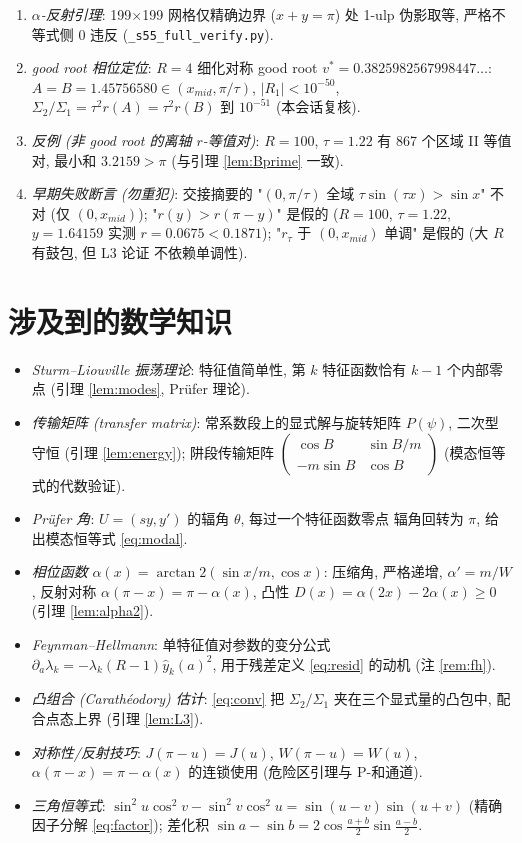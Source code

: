 \documentclass[UTF8]{ctexart}
\begin{document}
\begin{enumerate}
		(\texttt{\_s55\_bprime\_grid.py}, \texttt{\_s55\_minpair\_precise.py},
		本会话复核).
	\item \emph{$\alpha$-反射引理}: 199$\times$199 网格仅精确边界
		($x+y=\pi$) 处 1-ulp 伪影取等, 严格不等式侧 0 违反
		(\texttt{\_s55\_full\_verify.py}).
	\item \emph{good root 相位定位}: $R=4$ 细化对称 good root
		$v^*=0.3825982567998447\ldots$: $A=B=1.45756580\in(x_{mid},\pi/\tau)$,
		$|R_1|<10^{-50}$, $\Sigma_2/\Sigma_1=\tau^2r(A)=\tau^2r(B)$ 到 $10^{-51}$
		(本会话复核).
	\item \emph{反例 (非 good root 的离轴 $r$-等值对)}: $R=100$, $\tau=1.22$ 有
		867 个区域 II 等值对, 最小和 $3.2159>\pi$ (与引理 \ref{lem:Bprime} 一致).
	\item \emph{早期失败断言 (勿重犯)}: 交接摘要的 "$(0,\pi/\tau)$ 全域
		$\tau\sin(\tau x)>\sin x$" 不对 (仅 $(0,x_{mid})$); "$r(y)>r(\pi-y)$"
		是假的 ($R=100$, $\tau=1.22$, $y=1.64159$ 实测 $r=0.0675<0.1871$);
		"$r_\tau$ 于 $(0,x_{mid})$ 单调" 是假的 (大 $R$ 有鼓包, 但 L3 论证
		不依赖单调性).
\end{enumerate}

\section{涉及到的数学知识}\label{sec:math}

\begin{itemize}
	\item \emph{Sturm--Liouville 振荡理论}: 特征值简单性, 第 $k$ 特征函数恰有
		$k-1$ 个内部零点 (引理 \ref{lem:modes}, Pr\"ufer 理论).
	\item \emph{传输矩阵 (transfer matrix)}: 常系数段上的显式解与旋转矩阵
		$P(\psi)$, 二次型守恒 (引理 \ref{lem:energy}); 阱段传输矩阵
		$\begin{pmatrix}\cos B&\sin B/m\\-m\sin B&\cos B\end{pmatrix}$
		(模态恒等式的代数验证).
	\item \emph{Pr\"ufer 角}: $U=(sy,y')$ 的辐角 $\theta$, 每过一个特征函数零点
		辐角回转为 $\pi$, 给出模态恒等式 \eqref{eq:modal}.
	\item \emph{相位函数} $\alpha(x)=\arctan2(\sin x/m,\cos x)$: 压缩角,
		严格递增, $\alpha'=m/W$, 反射对称 $\alpha(\pi-x)=\pi-\alpha(x)$,
		凸性 $D(x)=\alpha(2x)-2\alpha(x)\ge0$ (引理 \ref{lem:alpha2}).
	\item \emph{Feynman--Hellmann}: 单特征值对参数的变分公式
		$\partial_a\lambda_k=-\lambda_k(R-1)\hat y_k(a)^2$, 用于残差定义
		\eqref{eq:resid} 的动机 (注 \ref{rem:fh}).
	\item \emph{凸组合 (Carath\'eodory) 估计}: \eqref{eq:conv} 把 $\Sigma_2/\Sigma_1$
		夹在三个显式量的凸包中, 配合点态上界 (引理 \ref{lem:L3}).
	\item \emph{对称性/反射技巧}: $J(\pi-u)=J(u)$, $W(\pi-u)=W(u)$,
		$\alpha(\pi-x)=\pi-\alpha(x)$ 的连锁使用 (危险区引理与 P-和通道).
	\item \emph{三角恒等式}: $\sin^2u\cos^2v-\sin^2v\cos^2u
		=\sin(u-v)\sin(u+v)$ (精确因子分解 \eqref{eq:factor});
		差化积 $\sin a-\sin b=2\cos\frac{a+b}2\sin\frac{a-b}2$.
\end{itemize}
\end{document}

